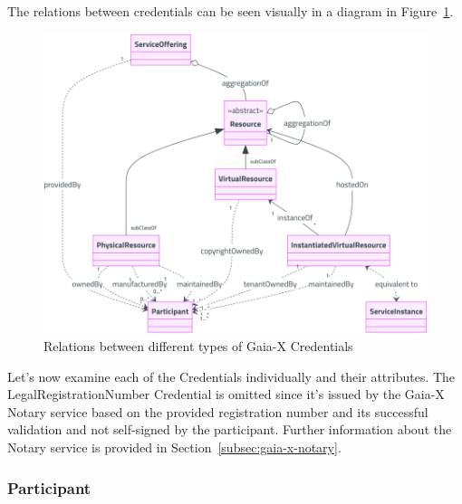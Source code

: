 The relations between credentials can be seen visually in a diagram in Figure~\ref{fig:credential_relations}.

\begin{figure}
    \centering
    \includegraphics[width=\textwidth]{figures/credential-relations.png}
    \caption{Relations between different types of Gaia-X Credentials~\cite{gaiax_architecture_document}}\label{fig:credential_relations}
\end{figure}

Let's now examine each of the Credentials individually and their attributes.
The LegalRegistrationNumber Credential is omitted since it's issued by the Gaia-X Notary service based on the provided registration number and its successful validation and not self-signed by the participant.
Further information about the Notary service is provided in Section~\ref{subsec:gaia-x-notary}.

\pagebreak

\subsubsection{Participant}

